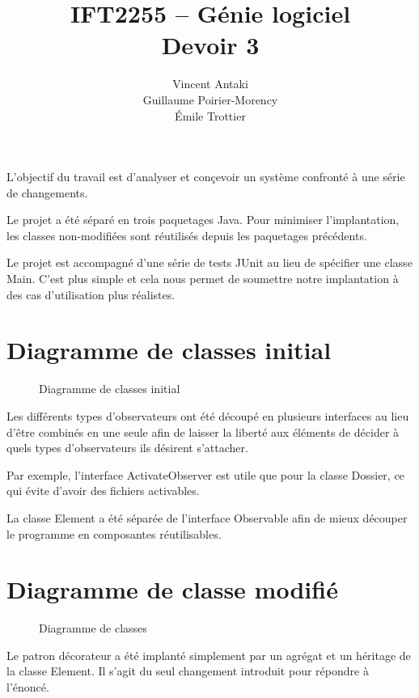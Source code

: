 \documentclass{article}
\title{IFT2255 -- Génie logiciel \\Devoir 3}
\author{Vincent Antaki \\ Guillaume Poirier-Morency \\ Émile Trottier}
\begin{document}
  \maketitle

  \abstract
  L'objectif du travail est d'analyser et conçevoir un système confronté à une
  série de changements.

  Le projet a été séparé en trois paquetages Java. Pour minimiser
  l'implantation, les classes non-modifiées sont réutilisés depuis les
  paquetages précédents.

  Le projet est accompagné d'une série de tests JUnit au lieu de spécifier une
  classe \textsf{Main}. C'est plus simple et cela nous permet de soumettre notre
  implantation à des cas d'utilisation plus réalistes.

  \section{Diagramme de classes initial}
  \begin{sidewaysfigure}
    \centering
    \resizebox{\textwidth}{!}{}
    \caption{Diagramme de classes initial}
  \end{sidewaysfigure}

  Les différents types d'observateurs ont été découpé en plusieurs interfaces au
  lieu d'être combinés en une seule afin de laisser la liberté aux éléments de
  décider à quels types d'observateurs ils désirent s'attacher.

  Par exemple, l'interface \textsf{ActivateObserver} est utile que pour la
  classe \textsf{Dossier}, ce qui évite d'avoir des fichiers activables.

  La classe \textsf{Element} a été séparée de l'interface \textsf{Observable}
  afin de mieux découper le programme en composantes réutilisables.

  \section{Diagramme de classe modifié}
  \begin{sidewaysfigure}
    \centering
    \resizebox{\textwidth}{!}{}
    \caption{Diagramme de classes}
  \end{sidewaysfigure}

  Le patron décorateur a été implanté simplement par un agrégat et un héritage
  de la classe \textsf{Element}. Il s'agit du seul changement introduit pour
  répondre à l'énoncé.
\end{document}
